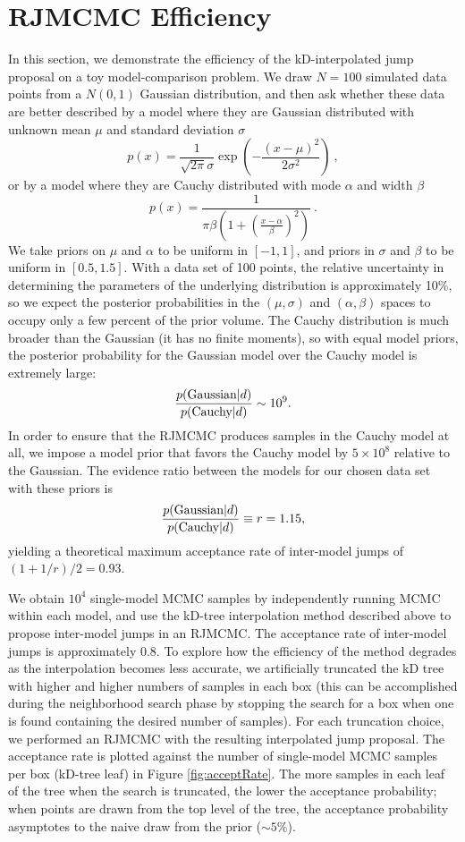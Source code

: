 \documentclass{iopart}
\newcommand{\be}{\begin{equation}}
\newcommand{\ee}{\end{equation}}
\begin{document}
\section{RJMCMC Efficiency}
\label{sec:efficiency}

In this section, we demonstrate the efficiency of the kD-interpolated
jump proposal on a toy model-comparison problem.  We draw $N = 100$
simulated data points from a $N(0,1)$ Gaussian distribution, and then
ask whether these data are better described by a model where they are
Gaussian distributed with unknown mean $\mu$ and standard deviation
$\sigma$
%
\be
p(x) = \frac{1}{\sqrt{2\pi} \sigma} \exp\left( - \frac{(x-\mu)^2}{2
    \sigma^2} \right)\ ,
\ee
%
or by a model where they are Cauchy distributed with mode $\alpha$
and width $\beta$
%
\be
p(x) = \frac{1}{\pi \beta \left( 1 + \left(\frac{x - \alpha}{\beta}\right)^2\right)}\ .
\ee
%
We take priors on $\mu$ and $\alpha$ to be uniform in $[-1,1]$, and
priors in $\sigma$ and $\beta$ to be uniform in $[0.5, 1.5]$.  With a
data set of 100 points, the relative uncertainty in determining the
parameters of the underlying distribution is approximately 10\%, so we
expect the posterior probabilities in the $(\mu,\sigma)$ and
$(\alpha,\beta)$ spaces to occupy only a few percent of the prior
volume.  The Cauchy distribution is much broader than the Gaussian (it
has no finite moments), so with equal model priors, the posterior
probability for the Gaussian model over the Cauchy model is extremely
large:
%
\be
\frac{p(\textnormal{Gaussian} | d)}{p(\textnormal{Cauchy}|d)} \sim 10^9.
\ee
%
In order to ensure that the RJMCMC produces samples in the Cauchy
model at all, we impose a model prior that favors the Cauchy model by
$5 \times 10^8$ relative to the Gaussian.  The evidence ratio between
the models for our chosen data set with these priors is
%
\be \frac{p(\textnormal{Gaussian} | d)}{p(\textnormal{Cauchy}|d)}
\equiv r = 1.15,
\ee
%
yielding a theoretical maximum acceptance rate of inter-model jumps of
$(1+1/r)/2 = 0.93$.

We obtain $10^4$ single-model MCMC samples by independently running
MCMC within each model, and use the kD-tree interpolation method
described above to propose inter-model jumps in an RJMCMC.  The
acceptance rate of inter-model jumps is approximately 0.8.  To explore
how the efficiency of the method degrades as the interpolation becomes
less accurate, we artificially truncated the kD tree with higher and
higher numbers of samples in each box (this can be accomplished during
the neighborhood search phase by stopping the search for a box when
one is found containing the desired number of samples).  For each
truncation choice, we performed an RJMCMC with the resulting
interpolated jump proposal.  The acceptance rate is plotted against
the number of single-model MCMC samples per box (kD-tree leaf) in
Figure \ref{fig:acceptRate}.  The more samples in each leaf of the tree
when the search is truncated, the lower the acceptance probability;
when points are drawn from the top level of the tree, the acceptance
probability asymptotes to the naive draw from the prior ($\sim 5\%$).
\end{document}
